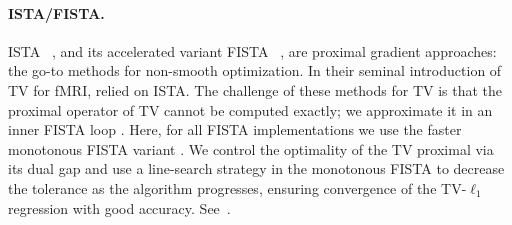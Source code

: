 \paragraph{ISTA/FISTA.}
ISTA~ \citep{daubechies2004}, and its accelerated variant
FISTA~ \citep{beck2009a}, are proximal gradient approaches: the go-to
methods for non-smooth optimization. In their seminal introduction of TV
for fMRI,  \citep{michel2011} relied on ISTA.
The challenge of these methods for TV is that the proximal operator
  of TV
cannot be computed exactly; we approximate it in an inner FISTA loop
 \citep{beck2009b,michel2011}.
Here, for all FISTA implementations we use
the faster monotonous FISTA variant  \citep{beck2009b}. We control the
optimality of the TV proximal via its dual gap  \citep{michel2011} and
use a line-search strategy in the monotonous FISTA to decrease the
tolerance as the algorithm progresses, ensuring convergence of the
TV-$\ell_1$ regression with good accuracy. See~\citep{dohmatob2014benchmarking,varoquaux2015faasta}.

